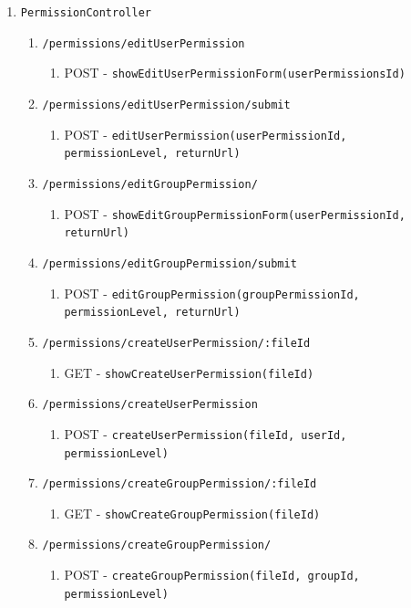 \documentclass[12pt,DIV14,BCOR10mm,a4paper,parskip=half-,headsepline,headinclude,english,ngerman,bibliography=totocnumbered]{scrreprt}
\begin{document}
\begin{enumerate}
\begin{enumerate}
    \item \texttt{PermissionController}
    \begin{enumerate}

      \item \texttt{/permissions/editUserPermission}
      \begin{enumerate}
        \item POST - \texttt{showEditUserPermissionForm(userPermissionsId)}
      \end{enumerate}
      \item \texttt{/permissions/editUserPermission/submit}
      \begin{enumerate}
        \item POST - \texttt{editUserPermission(userPermissionId,\\permissionLevel, returnUrl)}
      \end{enumerate}
      \item \texttt{/permissions/editGroupPermission/}
      \begin{enumerate}
        \item POST - \texttt{showEditGroupPermissionForm(userPermissionId,\\returnUrl)}
      \end{enumerate}
      \item \texttt{/permissions/editGroupPermission/submit}
      \begin{enumerate}
        \item POST - \texttt{editGroupPermission(groupPermissionId,\\permissionLevel, returnUrl)}
      \end{enumerate}

      \item \texttt{/permissions/createUserPermission/:fileId}
      \begin{enumerate}
        \item GET - \texttt{showCreateUserPermission(fileId)}
      \end{enumerate}
      \item \texttt{/permissions/createUserPermission}
      \begin{enumerate}
        \item POST - \texttt{createUserPermission(fileId, userId,\\permissionLevel)}
      \end{enumerate}
      \item \texttt{/permissions/createGroupPermission/:fileId}
      \begin{enumerate}
        \item GET - \texttt{showCreateGroupPermission(fileId)}
      \end{enumerate}
      \item \texttt{/permissions/createGroupPermission/}
      \begin{enumerate}
        \item POST - \texttt{createGroupPermission(fileId, groupId,\\permissionLevel)}
      \end{enumerate}


\end{enumerate}
\end{enumerate}
\end{enumerate}
\end{document}
